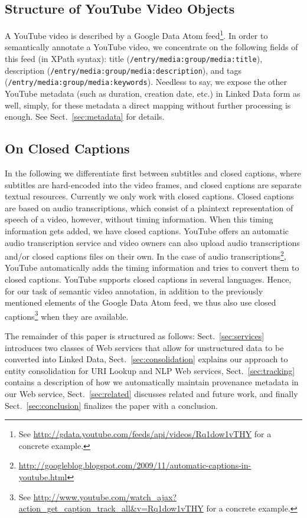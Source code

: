 \documentclass{acm_proc_article-sp}
\begin{document}
\subsection{Structure of YouTube Video Objects}\label{sec:youtubestructure}
A YouTube video is described by a Google Data Atom feed\footnote{See \url{http://gdata.youtube.com/feeds/api/videos/Rq1dow1vTHY} for a concrete example.}. In order to semantically annotate a YouTube video, we concentrate on the following fields of this feed (in XPath syntax): title ({\tt /entry/media:group/media:title}), description ({\tt /entry/media:group/media:description}), and tags ({\tt /entry/media:group/media:keywords}). Needless to say, we expose the other YouTube metadata  (such as duration, creation date, etc.) in Linked Data form as well, simply, for these metadata a direct mapping without further processing is enough. See Sect.~\ref{sec:metadata} for details.
\subsection{On Closed Captions}\label{sec:closedcaptions}
In the following we differentiate first between subtitles and closed captions, where subtitles are hard-encoded into the video frames, and closed captions are separate textual resources. Currently we only work with closed captions. Closed captions are based on audio transcriptions, which consist of a plaintext representation of speech of a video, however, without timing information. When this timing information gets added, we have closed captions. YouTube offers an automatic audio transcription service and video owners can also upload audio transcriptions and/or closed captions files on their own. In the case of audio transcriptions\footnote{\url{http://googleblog.blogspot.com/2009/11/automatic-captions-in-youtube.html}}, YouTube automatically adds the timing information and tries to convert them to closed captions. YouTube supports closed captions in several languages. Hence, for our task of semantic video annotation, in addition to the previously mentioned elements of the Google Data Atom feed, we thus also use closed captions\footnote{See \url{http://www.youtube.com/watch_ajax?action_get_caption_track_all&v=Rq1dow1vTHY} for a concrete example.} when they are available.

The remainder of this paper is structured as follows: Sect.~\ref{sec:services} introduces two classes of Web services that allow for unstructured data to be converted into Linked Data, Sect.~\ref{sec:consolidation} explains our approach to entity consolidation for URI Lookup and NLP Web services, Sect.~\ref{sec:tracking} contains a description of how we automatically maintain provenance metadata in our Web service, Sect.~\ref{sec:related} discusses related and future work, and finally Sect.~\ref{sec:conclusion} finalizes the paper with a conclusion.
\end{document}
